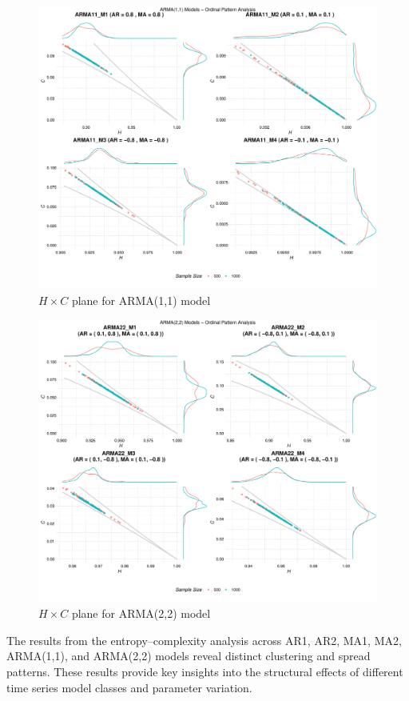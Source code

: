 \documentclass[12pt,a4paper]{article}
\begin{document}
\begin{figure}[H]
	\includegraphics[width=0.9 \textwidth]{ARMA11_combined_analysis}
	\caption{$H \times C$ plane for ARMA(1,1) model}
	\label{fig:HC ARMA(11)}
\end{figure}	

\begin{figure}[H]
	\includegraphics[width=0.9 \textwidth]{ARMA22_combined_analysis}
	\caption{$H \times C$ plane for ARMA(2,2) model}
	\label{fig:HC ARMA(22)}
\end{figure}


The results from the entropy–complexity analysis across AR1, AR2, MA1, MA2, ARMA(1,1), and ARMA(2,2) models reveal distinct clustering and spread patterns. These results provide key insights into the structural effects of different time series model classes and parameter variation.
\end{document}
